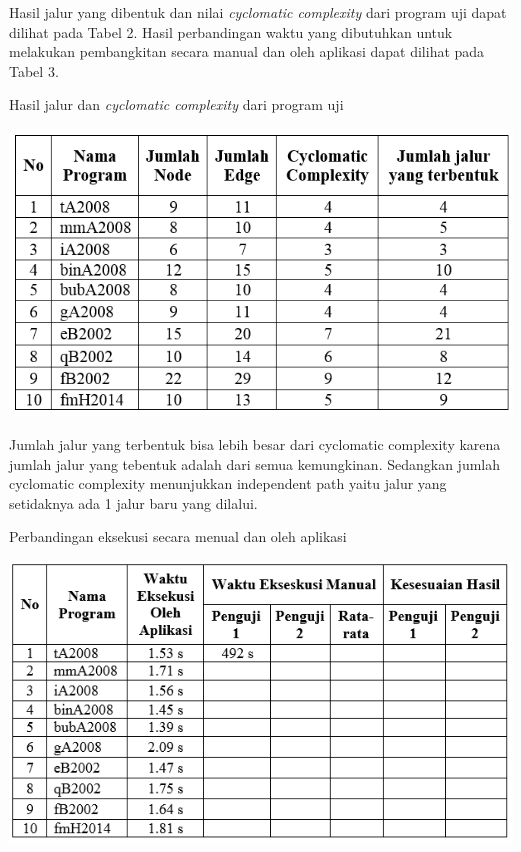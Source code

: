 Hasil jalur yang dibentuk dan nilai \textit{cyclomatic complexity} dari program uji dapat dilihat pada Tabel 2. Hasil perbandingan waktu yang dibutuhkan untuk melakukan pembangkitan secara manual dan oleh aplikasi dapat dilihat pada Tabel 3.
\begin{table}
	\centering
	\caption{Hasil jalur dan \textit{cyclomatic complexity} dari program uji}
	\label{tab:tabeljalur}
	\includegraphics[width=0.9\linewidth]{gambar/tabeljalur}
\end{table}

Jumlah jalur yang terbentuk bisa lebih besar dari cyclomatic complexity karena jumlah jalur yang tebentuk adalah dari semua kemungkinan. Sedangkan jumlah cyclomatic complexity menunjukkan independent path yaitu jalur yang setidaknya ada 1 jalur baru yang dilalui.    

\begin{table}
	\centering
	\caption{Perbandingan eksekusi secara menual dan oleh aplikasi}
	\label{fig:tabelperbandingan}
	\includegraphics[width=0.9\linewidth]{gambar/tabelperbandingan}
\end{table}


